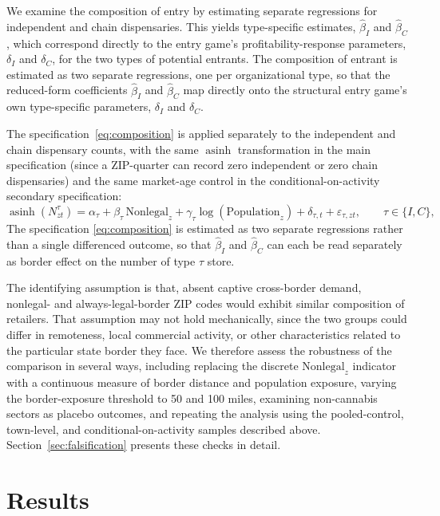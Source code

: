 \documentclass[english,12pt]{article}
\begin{document}
We examine the composition of entry by estimating separate regressions for independent and chain dispensaries. This yields type-specific estimates, $\hat{\beta}_I$ and $\hat{\beta}_C$, which correspond directly to the entry game's profitability-response parameters, $\delta_I$ and $\delta_C$, for the two types of potential entrants.
 The composition of entrant is estimated as two separate regressions, one per organizational type, so that the reduced-form coefficients $\hat\beta_I$ and $\hat\beta_C$ map directly onto the structural entry game's own type-specific parameters, $\delta_I$ and $\delta_C$.
 
The specification~\eqref{eq:composition} is applied separately to the independent and chain dispensary counts, with the same $\operatorname{asinh}$ transformation in the main specification (since a ZIP-quarter can record zero independent or zero chain dispensaries) and the same market-age control in the conditional-on-activity secondary specification:
\begin{equation}
\label{eq:composition}
\operatorname{asinh}(N^\tau_{zt})=\alpha_\tau
+
\beta_\tau\, \text{Nonlegal}_z
+
\gamma_\tau \log(\text{Population}_z)
+
\delta_{\tau,t}
+
\varepsilon_{\tau,zt}, \qquad \tau \in \{I, C\},
\end{equation}
The specification \ref{eq:composition} is estimated as two separate regressions rather than a single differenced outcome, so that $\hat\beta_I$ and $\hat\beta_C$ can each be read separately as border effect on the number of type $\tau$ store.

The identifying assumption is that, absent captive cross-border demand, nonlegal- and always-legal-border ZIP codes would exhibit similar composition of retailers. That assumption may not hold mechanically, since the two groups could differ in remoteness, local commercial activity, or other characteristics related to the particular state border they face. We therefore assess the robustness of the comparison in several ways, including replacing the discrete $\text{Nonlegal}_z$ indicator with a continuous measure of border distance and population exposure, varying the border-exposure threshold to 50 and 100 miles, examining non-cannabis sectors as placebo outcomes, and repeating the analysis using the pooled-control, town-level, and conditional-on-activity samples described above. Section~\ref{sec:falsification} presents these checks in detail.

\section{Results}
\end{document}
